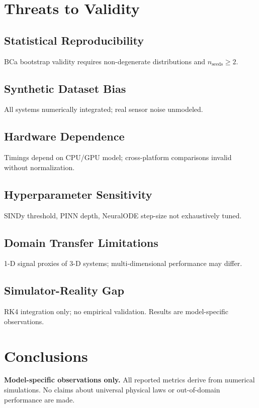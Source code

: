\documentclass[12pt,a4paper]{article}
\begin{document}
\section{Threats to Validity}
\subsection{Statistical Reproducibility}
BCa bootstrap validity requires non-degenerate distributions and $n_{\text{seeds}} \geq 2$.
\subsection{Synthetic Dataset Bias}
All systems numerically integrated; real sensor noise unmodeled.
\subsection{Hardware Dependence}
Timings depend on CPU/GPU model; cross-platform comparisons invalid without normalization.
\subsection{Hyperparameter Sensitivity}
SINDy threshold, PINN depth, NeuralODE step-size not exhaustively tuned.
\subsection{Domain Transfer Limitations}
1-D signal proxies of 3-D systems; multi-dimensional performance may differ.
\subsection{Simulator-Reality Gap}
RK4 integration only; no empirical validation. Results are model-specific observations.

\section{Conclusions}
\textbf{Model-specific observations only.} All reported metrics derive from numerical simulations.
No claims about universal physical laws or out-of-domain performance are made.



\end{document}
